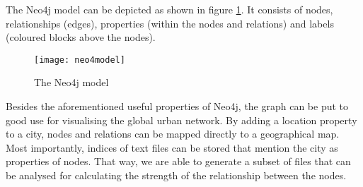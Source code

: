The Neo4j model can be depicted as shown in figure \ref{fig:neo4j}. It consists of nodes, relationships (edges), properties (within the nodes and relations) and labels (coloured blocks above the nodes).

\begin{figure}[ht]
\centering
\texttt{[image: neo4model]}
\caption{The Neo4j model \protect\footnotemark{}}
\label{fig:neo4j}
\end{figure}

Besides the aforementioned useful properties of Neo4j, the graph can be put to good use for visualising the global urban network. By adding a location property to a city, nodes and relations can be mapped directly to a geographical map. Most importantly, indices of text files can be stored that mention the city as properties of nodes. That way, we are able to generate a subset of files that can be analysed for calculating the strength of the relationship between the nodes.









